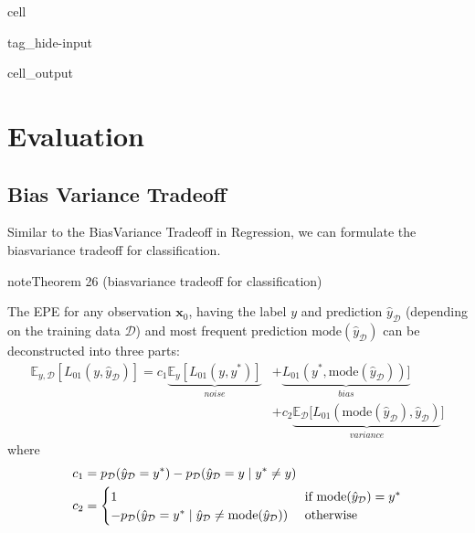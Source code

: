 \documentclass[letterpaper,10pt,english]{jupyterBook}
\begin{document}
\begin{sphinxuseclass}{cell}
\begin{sphinxuseclass}{tag_hide-input}\begin{sphinxVerbatimOutput}

\begin{sphinxuseclass}{cell_output}
\noindent{}

\end{sphinxuseclass}\end{sphinxVerbatimOutput}

\end{sphinxuseclass}
\end{sphinxuseclass}
\sphinxstepscope


\section{Evaluation}
\label{\detokenize{classification_evaluation:evaluation}}\label{\detokenize{classification_evaluation::doc}}

\subsection{Bias Variance Tradeoff}
\label{\detokenize{classification_evaluation:bias-variance-tradeoff}}\label{\detokenize{classification_evaluation:class-evaluation}}
\sphinxAtStartPar
Similar to the Bias\sphinxhyphen{}Variance Tradeoff in Regression, we can formulate the bias\sphinxhyphen{}variance tradeoff for classification.
\label{classification_evaluation:theorem-0}
\begin{sphinxadmonition}{note}{Theorem 26 (bias\sphinxhyphen{}variance tradeoff for classification)}



\sphinxAtStartPar
The EPE for any observation \(\mathbf{x}_0\), having the label \(y\) and prediction \(\hat{y}_\mathcal{D}\) (depending on the training data \(\mathcal{D}\)) and most frequent prediction \(\mathrm{mode}(\hat{y}_\mathcal{D})\) can be deconstructed into three parts:
\begin{align*}
    \mathbb{E}_{y,\mathcal{D}}[L_{01}(y,\hat{y}_\mathcal{D})]  
    = c_1\underbrace{\mathbb{E}_y[L_{01}(y,y^*)]}_{noise} &+\underbrace{L_{01}(y^*,\mathrm{mode}(\hat{y}_\mathcal{D}))]}_{bias}\\ &+c_2\underbrace{\mathbb{E}_\mathcal{D}[L_{01}(\mathrm{mode}(\hat{y}_\mathcal{D}),\hat{y}_\mathcal{D})}_{variance}] 
\end{align*}
\sphinxAtStartPar
where
\begin{align*}
c_1 &= p_{\mathcal{D}}(\hat{y}_{\cal D} = y^*)-p_{\cal D}(\hat{y}_{\cal D}=y\mid y^*\neq y)\\
c_2&= \begin{cases}
1 & \text{ if } \mathrm{mode}(\hat{y}_\mathcal{D}) = y^*\\
-p_{\mathcal{D}}(\hat{y}_\mathcal{D}=y^*\mid \hat{y}_\mathcal{D}\neq\mathrm{mode}(\hat{y}_\mathcal{D})) & \text{ otherwise}
\end{cases}
\end{align*}\end{sphinxadmonition}
\end{document}
